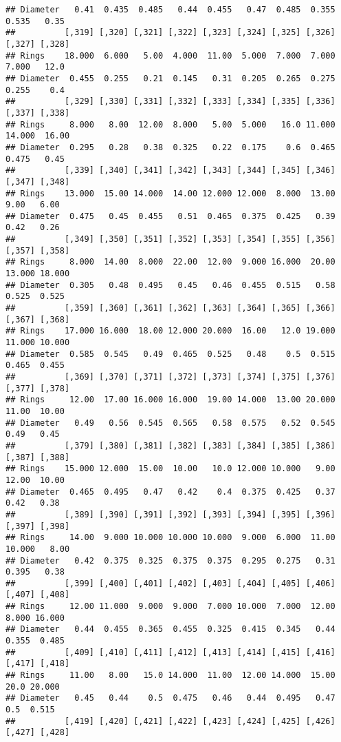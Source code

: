 \documentclass[
]{article}
\begin{document}
\begin{verbatim}
## Diameter   0.41  0.435  0.485   0.44  0.455   0.47  0.485  0.355  0.535   0.35
##          [,319] [,320] [,321] [,322] [,323] [,324] [,325] [,326] [,327] [,328]
## Rings    18.000  6.000   5.00  4.000  11.00  5.000  7.000  7.000  7.000   12.0
## Diameter  0.455  0.255   0.21  0.145   0.31  0.205  0.265  0.275  0.255    0.4
##          [,329] [,330] [,331] [,332] [,333] [,334] [,335] [,336] [,337] [,338]
## Rings     8.000   8.00  12.00  8.000   5.00  5.000   16.0 11.000 14.000  16.00
## Diameter  0.295   0.28   0.38  0.325   0.22  0.175    0.6  0.465  0.475   0.45
##          [,339] [,340] [,341] [,342] [,343] [,344] [,345] [,346] [,347] [,348]
## Rings    13.000  15.00 14.000  14.00 12.000 12.000  8.000  13.00   9.00   6.00
## Diameter  0.475   0.45  0.455   0.51  0.465  0.375  0.425   0.39   0.42   0.26
##          [,349] [,350] [,351] [,352] [,353] [,354] [,355] [,356] [,357] [,358]
## Rings     8.000  14.00  8.000  22.00  12.00  9.000 16.000  20.00 13.000 18.000
## Diameter  0.305   0.48  0.495   0.45   0.46  0.455  0.515   0.58  0.525  0.525
##          [,359] [,360] [,361] [,362] [,363] [,364] [,365] [,366] [,367] [,368]
## Rings    17.000 16.000  18.00 12.000 20.000  16.00   12.0 19.000 11.000 10.000
## Diameter  0.585  0.545   0.49  0.465  0.525   0.48    0.5  0.515  0.465  0.455
##          [,369] [,370] [,371] [,372] [,373] [,374] [,375] [,376] [,377] [,378]
## Rings     12.00  17.00 16.000 16.000  19.00 14.000  13.00 20.000  11.00  10.00
## Diameter   0.49   0.56  0.545  0.565   0.58  0.575   0.52  0.545   0.49   0.45
##          [,379] [,380] [,381] [,382] [,383] [,384] [,385] [,386] [,387] [,388]
## Rings    15.000 12.000  15.00  10.00   10.0 12.000 10.000   9.00  12.00  10.00
## Diameter  0.465  0.495   0.47   0.42    0.4  0.375  0.425   0.37   0.42   0.38
##          [,389] [,390] [,391] [,392] [,393] [,394] [,395] [,396] [,397] [,398]
## Rings     14.00  9.000 10.000 10.000 10.000  9.000  6.000  11.00 10.000   8.00
## Diameter   0.42  0.375  0.325  0.375  0.375  0.295  0.275   0.31  0.395   0.38
##          [,399] [,400] [,401] [,402] [,403] [,404] [,405] [,406] [,407] [,408]
## Rings     12.00 11.000  9.000  9.000  7.000 10.000  7.000  12.00  8.000 16.000
## Diameter   0.44  0.455  0.365  0.455  0.325  0.415  0.345   0.44  0.355  0.485
##          [,409] [,410] [,411] [,412] [,413] [,414] [,415] [,416] [,417] [,418]
## Rings     11.00   8.00   15.0 14.000  11.00  12.00 14.000  15.00   20.0 20.000
## Diameter   0.45   0.44    0.5  0.475   0.46   0.44  0.495   0.47    0.5  0.515
##          [,419] [,420] [,421] [,422] [,423] [,424] [,425] [,426] [,427] [,428]

\end{verbatim}
\end{document}
